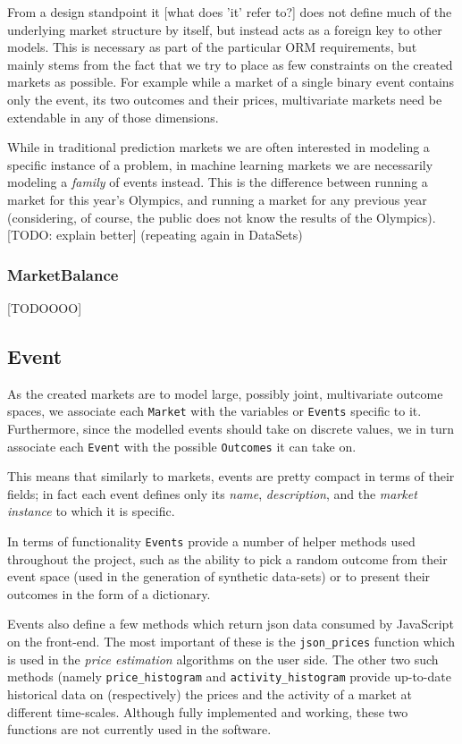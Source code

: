 \documentclass[bsc,frontabs,twoside,singlespacing,parskip,deptreport]{infthesis}     %
\begin{document}
    From a design standpoint it [what does 'it' refer to?] does not define much of the underlying market structure by itself, but instead acts as a foreign key to other models. This is necessary as part of the particular ORM requirements, but mainly stems from the fact that we try to place as few constraints on the created markets as possible. For example while a market of a single binary event contains only the event, its two outcomes and their prices, multivariate markets need be extendable in any of those dimensions. 

       
    While in traditional prediction markets we are often interested in modeling a specific instance of a problem, in machine learning markets we are necessarily modeling a {\em family} of events instead. This is the difference between running a market for this year’s Olympics, and running a market for any previous year (considering, of course, the public does not know the results of the Olympics). [TODO: explain better] (repeating again in DataSets)

\subsubsection{MarketBalance}

	[TODOOOO]
    
\subsection{Event}

	As the created markets are to model large, possibly joint, multivariate outcome spaces, we associate each {\tt Market} with the variables or {\tt Events} specific to it. Furthermore, since the modelled events should take on discrete values, we in turn associate each {\tt Event} with the possible {\tt Outcomes} it can take on. 

	This means that similarly to markets, events are pretty compact in terms of their fields; in fact each event defines only its {\em name}, {\em description}, and the {\em market instance} to which it is specific.

	In terms of functionality {\tt Events} provide a number of helper methods used throughout the project, such as the ability to pick a random outcome from their event space (used in the generation of synthetic data-sets) or to present their outcomes in the form of a dictionary. 
	
	Events also define a few methods which return json data consumed by JavaScript on the front-end. The most important of these is the {\tt json\_prices} function which is used in the {\it price estimation} algorithms on the user side. The other two such methods (namely {\tt price\_histogram} and {\tt activity\_histogram} provide up-to-date historical data on (respectively) the prices and the activity of a market at different time-scales. Although fully implemented and working, these two functions are not currently used in the software. 
\end{document}
